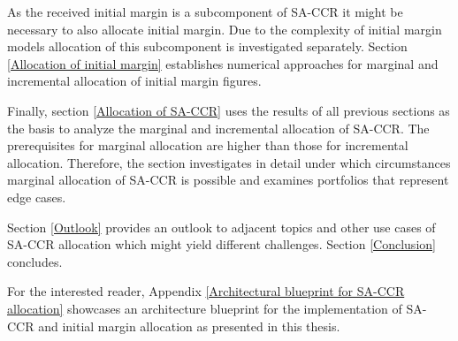 \documentclass[../Thesis_AHoecherl.tex]{subfiles}
\begin{document}
    As the received initial margin is a subcomponent of SA-CCR it might be necessary to also allocate initial margin. Due to the complexity of initial margin models allocation of this subcomponent is investigated separately. Section \ref{Allocation of initial margin} establishes numerical approaches for marginal and incremental allocation of initial margin figures.

    Finally, section \ref{Allocation of SA-CCR} uses the results of all previous sections as the basis to analyze the marginal and incremental allocation of SA-CCR. The prerequisites for marginal allocation are higher than those for incremental allocation. Therefore, the section investigates in detail under which circumstances marginal allocation of SA-CCR is possible and examines portfolios that represent edge cases.
    
    Section \ref{Outlook} provides an outlook to adjacent topics and other use cases of SA-CCR allocation which might yield different challenges. Section \ref{Conclusion} concludes.

    For the interested reader, Appendix \ref{Architectural blueprint for SA-CCR allocation} showcases an architecture blueprint for the implementation of SA-CCR and initial margin allocation as presented in this thesis.
\end{document}
